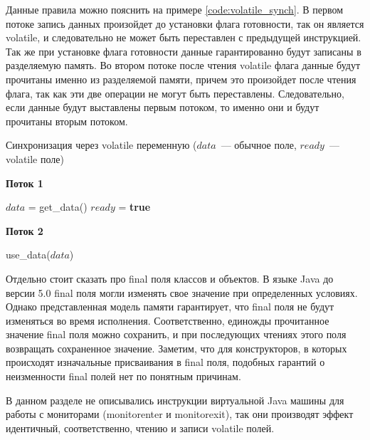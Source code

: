 \documentclass[14pt,titlepage]{extarticle}
\newcommand{\algorithmictitle}[1]{\hspace{8mm}\textbf{#1}}
\newcommand{\BOOLTRUE}{\textbf{true }}
\newcommand{\eng}[1]{{\English#1}}
\begin{document}
      Данные правила можно пояснить на примере \ref{code:volatile_synch}.
      В первом потоке запись данных произойдет до установки флага готовности,
      так он является \eng{volatile}, и следовательно не может быть переставлен
      с предыдущей инструкцией. Так же при установке флага готовности данные
      гарантированно будут записаны в разделяемую память.
      Во втором потоке после чтения \eng{volatile} флага данные будут прочитаны
      именно из разделяемой памяти, причем это произойдет после чтения флага,
      так как эти две операции не могут быть переставлены.
      Следовательно, если данные будут выставлены первым потоком, то именно
      они и будут прочитаны вторым потоком.
      \begin{algorithm}
        \caption{Синхронизация через \eng{volatile} переменную
          ($data$~--- обычное поле, $ready$~--- \eng{volatile} поле)}
        \label{code:volatile_synch}
        \begin{multicols*}{2}
          \algorithmictitle{Поток 1}
          \begin{algorithmic}[1]
            \STATE $data$ = get\_data()
            \STATE $ready$ = \BOOLTRUE
          \end{algorithmic}
          \columnbreak
          \algorithmictitle{Поток 2}
          \begin{algorithmic}[1]
            \STATE {}
            \ENDWHILE
            \STATE use\_data($data$)
          \end{algorithmic}
        \end{multicols*}
      \end{algorithm}

      Отдельно стоит сказать про \eng{final} поля классов и объектов.
      В языке Java до версии 5.0 \eng{final} поля могли изменять свое значение
      при определенных условиях. Однако представленная модель памяти
      гарантирует, что \eng{final} поля не будут изменяться во время
      исполнения. Соответственно, единожды прочитанное значение \eng{final}
      поля можно сохранить, и при последующих чтениях этого поля возвращать
      сохраненное значение.
      Заметим, что для конструкторов, в которых происходят изначальные
      присваивания в \eng{final} поля, подобных гарантий о неизменности
      \eng{final} полей нет по понятным причинам.

      В данном разделе не описывались инструкции виртуальной Java машины для
      работы с мониторами (\eng{monitorenter} и \eng{monitorexit}), так они
      производят эффект идентичный, соответственно, чтению и записи
      \eng{volatile} полей.
\end{document}
